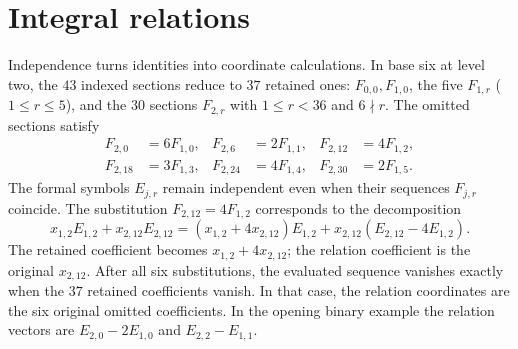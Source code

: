 \documentclass[11pt]{article}
\begin{document}
\section{Integral relations}\label{sec:base-six-test}
Independence turns identities into coordinate calculations. In base six
at level two, the $43$ indexed sections reduce to $37$ retained ones:
$F_{0,0},F_{1,0}$, the five
$F_{1,r}$ ($1\le r\le5$), and the $30$ sections $F_{2,r}$ with
$1\le r<36$ and $6\nmid r$. The omitted sections satisfy
\[
\begin{aligned}
 F_{2,0}&=6F_{1,0}, & F_{2,6}&=2F_{1,1}, & F_{2,12}&=4F_{1,2},\\
 F_{2,18}&=3F_{1,3}, & F_{2,24}&=4F_{1,4}, & F_{2,30}&=2F_{1,5}.
\end{aligned}
\]
The formal symbols $E_{j,r}$ remain independent even when their
sequences $F_{j,r}$ coincide. The substitution $F_{2,12}=4F_{1,2}$
corresponds to the decomposition
\[
 x_{1,2}E_{1,2}+x_{2,12}E_{2,12}
 = (x_{1,2}+4x_{2,12})E_{1,2}
   +x_{2,12}(E_{2,12}-4E_{1,2}).
\]
The retained coefficient becomes $x_{1,2}+4x_{2,12}$; the relation
coefficient is the original $x_{2,12}$. After all six substitutions,
the evaluated sequence vanishes exactly when the $37$ retained
coefficients vanish. In that case, the relation coordinates are the six
original omitted coefficients. In the opening binary example the
relation vectors are $E_{2,0}-2E_{1,0}$ and $E_{2,2}-E_{1,1}$.
\end{document}
